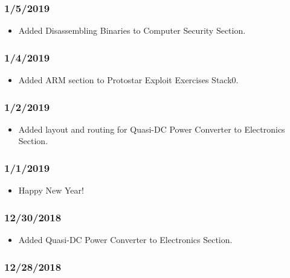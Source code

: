 \subsubsection{1/5/2019}

\begin{itemize}
\item Added Disassembling Binaries to Computer Security Section.
\end{itemize}

\subsubsection{1/4/2019}

\begin{itemize}
\item Added ARM section to Protostar Exploit Exercises Stack0.
\end{itemize}

\subsubsection{1/2/2019}

\begin{itemize}
\item Added layout and routing for Quasi-DC Power Converter to Electronics Section.
\end{itemize}

\subsubsection{1/1/2019}

\begin{itemize}
\item Happy New Year!
\end{itemize}

\subsubsection{12/30/2018}

\begin{itemize}
\item Added Quasi-DC Power Converter to Electronics Section.
\end{itemize}

\subsubsection{12/28/2018}

